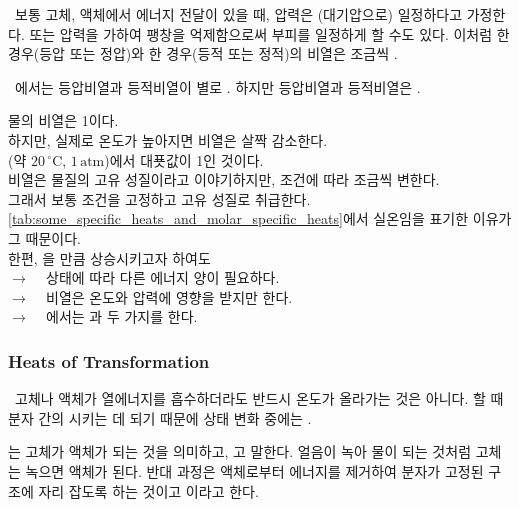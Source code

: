 \ 보통 고체, 액체에서 에너지 전달이 있을 때, 압력은 (대기압으로) 일정하다고 가정한다.
또는 압력을 가하여 팽창을 억제함으로써 부피를 일정하게 할 수도 있다.
이처럼 한 경우(등압 또는 정압)와
한 경우(등적 또는 정적)의 비열은 조금씩 .

\ 에서는 등압비열과 등적비열이 별로 .
하지만  등압비열과 등적비열은 .
\clearpage



\begin{sssbox}
\bnset
\bn 물의 비열은 1이다. \\
\bns 하지만, 실제로 온도가 높아지면 비열은 살짝 감소한다. \\
\bns {}(약 $20\,^\circ\mathrm{C}$, $1\,\mathrm{atm}$)에서 대푯값이 1인 것이다. \\
\bn 비열은 물질의 고유 성질이라고 이야기하지만, 조건에 따라 조금씩 변한다. \\
\bns 그래서 보통 조건을 고정하고 고유 성질로 취급한다. \\
\bns \autoref{tab:some_specific_heats_and_molar_specific_heats}에서
실온임을 표기한 이유가 그 때문이다. \\
\bn 한편, 을 만큼 상승시키고자 하여도 \\
\bns $\longrightarrow$ ~ 상태에 따라 다른 에너지 양이 필요하다. \\
\bns $\longrightarrow$ ~ 비열은 온도와 압력에 영향을 받지만
한다. \\
\bns $\longrightarrow$ ~ 에서는 과 
두 가지를 한다.
\end{sssbox}





\subsubsection{Heats of Transformation}
%
\ 고체나 액체가 열에너지를 흡수하더라도 반드시 온도가 올라가는 것은 아니다.
할 때 분자 간의 시키는 데
되기 때문에
상태 변화 중에는 .

\anset
{} 는 고체가 액체가 되는 것을 의미하고,
고 말한다.
얼음이 녹아 물이 되는 것처럼 고체는 녹으면 액체가 된다.
반대 과정은 액체로부터 에너지를 제거하여 분자가 고정된 구조에 자리 잡도록 하는 것이고
이라고 한다. \\

